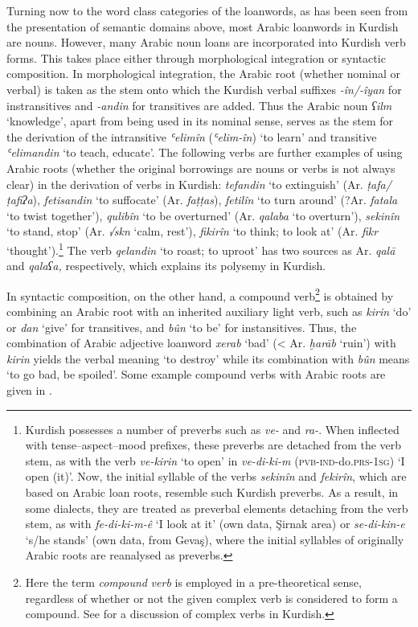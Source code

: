 \documentclass[output=paper]{langsci/langscibook}
\begin{document}
Turning now to the word class categories of the loanwords, as has been seen from the presentation of semantic domains above, most Arabic loanwords in Kurdish are nouns. However, many Arabic noun loans are incorporated into Kurdish verb forms. This takes place either through morphological integration or syntactic composition. In morphological integration, the Arabic root (whether nominal or verbal) is taken as the stem onto which the Kurdish verbal suffixes \textit{-în/-îyan} for instransitives and \textit{{}-andin} for transitives are added. Thus the Arabic noun \textit{ʕilm} ‘knowledge’, apart from being used in its nominal sense, serves as the stem for the derivation of the intransitive \textit{ʿelimîn} (\textit{ʿelim-în}) ‘to learn’ and transitive \textit{ʿelimandin} ‘to teach, educate’. The following verbs are further examples of using Arabic roots (whether the original borrowings are nouns or verbs is not always clear) in the derivation of verbs in Kurdish: \textit{tefandin} ‘to extinguish’ (Ar. \textit{ṭafa/ṭafiʔa}), \textit{fetisandin} ‘to suffocate’ (Ar. \textit{faṭṭas}), \textit{fetilîn} ‘to turn around’ (?Ar. \textit{fatala} ‘to twist together’), \textit{qulibîn} ‘to be overturned’ (Ar. \textit{qalaba} ‘to overturn’), \textit{sekinîn} ‘to stand, stop’ (Ar. \textit{√skn} ‘calm, rest’), \textit{fikirîn} ‘to think; to look at’ (Ar. \textit{fikr} ‘thought’).\footnote{Kurdish possesses a number of preverbs such as \textit{ve-} and \textit{ra-}. When inflected with tense--aspect--mood prefixes, these preverbs are detached from the verb stem, as with the verb \textit{ve-kirin} ‘to open’ in \textit{ve-di-ki-m} (\textsc{pvb-ind}{}-do.\textsc{prs-1sg}) ‘I open (it)’. Now, the initial syllable of the verbs \textit{sekinîn} and \textit{fekirîn}, which are based on Arabic loan roots, resemble such Kurdish preverbs. As a result, in some dialects, they are treated as preverbal elements detaching from the verb stem, as with \textit{fe-di-ki-m-ê} ‘I look at it’ (own data, Şirnak area) or \textit{se-di-kin-e} ‘s/he stands’ (own data, from Gevaş), where the initial syllables of originally Arabic roots are reanalysed as preverbs.}  The verb \textit{qelandin} ‘to roast; to uproot’ has two sources as Ar. \textit{qalā} and \textit{qalaʕa,} respectively, which explains its polysemy in Kurdish. 

In syntactic composition, on the other hand, a compound verb\footnote{Here the term \textit{compound} \textit{verb} is employed in a pre-theoretical sense, regardless of whether or not the given complex verb is considered to form a compound. See \citet{Haig2002} for a discussion of complex verbs in Kurdish.}  is obtained by combining an Arabic root with an inherited auxiliary light verb, such as \textit{kirin} ‘do’ or \textit{dan} ‘give’ for transitives, and \textit{bûn} ‘to be’ for instansitives. Thus, the combination of Arabic adjective loanword \textit{xerab} ‘bad’ (< Ar. \textit{ḫarāb} ‘ruin’) with \textit{kirin} yields the verbal meaning ‘to destroy’ while its combination with \textit{bûn} means ‘to go bad, be spoiled’. Some example compound verbs with Arabic roots are given in .
\end{document}
